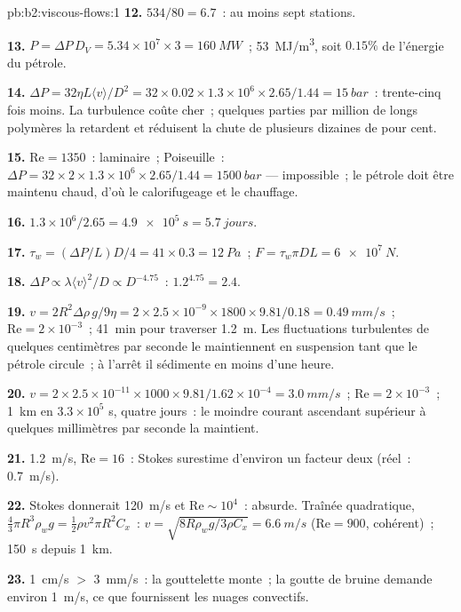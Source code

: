 \begin{solution}{pb:b2:viscous-flows:1}
\textbf{12.} $534/80 = 6.7$~: au moins sept stations.

\textbf{13.} $P = \Delta P\,D_V = 5.34 \times 10^7 \times 3 = \qty{160}{MW}$~;
\qty{53}{MJ/m^3}, soit $0.15\%$ de l'énergie du pétrole.

\textbf{14.} $\Delta P = 32\eta L\langle v\rangle/D^2 = 32 \times 0.02 \times 1.3 \times 10^6
\times 2.65/1.44 = \qty{15}{bar}$~: trente-cinq fois moins. La turbulence coûte
cher~; quelques parties par million de longs polymères la retardent et réduisent
la chute de plusieurs dizaines de pour cent.

\textbf{15.} $\mathrm{Re} = 1350$~: laminaire~; Poiseuille~: $\Delta P = 32 \times 2 \times 1.3 \times
10^6 \times 2.65/1.44 = \qty{1500}{bar}$ --- impossible~; le pétrole doit être maintenu
chaud, d'où le calorifugeage et le chauffage.

\textbf{16.} $1.3 \times 10^6/2.65 = \qty{4.9e5}{s} = \qty{5.7}{jours}$.

\textbf{17.} $\tau_w = (\Delta P/L)D/4 = 41 \times 0.3 = \qty{12}{Pa}$~; $F = \tau_w\pi DL =
\qty{6e7}{N}$.

\textbf{18.} $\Delta P \propto \lambda\langle v\rangle^2/D \propto D^{-4.75}$~: $1.2^{4.75} = 2.4$.

\textbf{19.} $v = 2R^2\Delta\rho\,g/9\eta = 2 \times 2.5 \times 10^{-9} \times 1800 \times 9.81/
0.18 = \qty{0.49}{mm/s}$~; $\mathrm{Re} = 2 \times 10^{-3}$~; \qty{41}{min} pour traverser
\qty{1.2}{m}. Les fluctuations turbulentes de quelques centimètres par seconde
le maintiennent en suspension tant que le pétrole circule~; à l'arrêt il sédimente en
moins d'une heure.

\textbf{20.} $v = 2 \times 2.5 \times 10^{-11} \times 1000 \times 9.81/1.62 \times 10^{-4} =
\qty{3.0}{mm/s}$~; $\mathrm{Re} = 2 \times 10^{-3}$~; \qty{1}{km} en $3.3 \times 10^5$ s, quatre
jours~: le moindre courant ascendant supérieur à quelques millimètres par seconde la maintient.

\textbf{21.} \qty{1.2}{m/s}, $\mathrm{Re} = 16$~: Stokes surestime d'environ un
facteur deux (réel~: \qty{0.7}{m/s}).

\textbf{22.} Stokes donnerait \qty{120}{m/s} et $\mathrm{Re} \sim 10^4$~: absurde.
Traînée quadratique, $\tfrac43\pi R^3\rho_wg = \tfrac12\rho v^2\pi R^2C_x$~: $v = \sqrt{8R
\rho_wg/3\rho C_x} = \qty{6.6}{m/s}$ ($\mathrm{Re} = 900$, cohérent)~; \qty{150}{s} depuis
\qty{1}{km}.

\textbf{23.} \qty{1}{cm/s} $>$ \qty{3}{mm/s}~: la gouttelette monte~; la goutte de bruine
demande environ \qty{1}{m/s}, ce que fournissent les nuages convectifs.


\end{solution}
